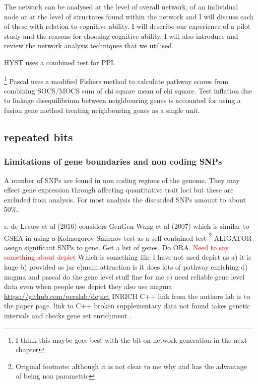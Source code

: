 The network can be analysed at the level of overall network, of an individual node or at the level of structures found within the network and I will discuss each of these with relation to cognitive ability. I will describe our experience of a pilot study and the reasons for choosing cognitive ability. I will also introduce and review the network analysis techniques that we utilised. 

HYST \cite{li2012hyst} uses a combined test for PPI. 

\cite{jia2011dmgwas}

\cite{baranzini2013network}
\footnote{I think this maybe goes best with the bit on network generation in the next chapter}
Pascal uses a modified Fishers method to calculate pathway scores from combining SOCS/MOCS sum of chi square mean of chi square. Test inflation due to linkage disequilibrium between neighbouring genes is accounted for using a fusion gene method treating neighbouring genes as a single unit. %

\subsection{repeated bits}
\subsubsection{Limitations of gene boundaries and non coding SNPs}
A number of SNPs are found in non coding regions of the genome. They may effect gene expression through affecting quantitative trait loci but these are excluded from analysis. For most analysis the discarded SNPs amount to about 50\%.


s. de Leeuw et al (2016) \cite{de2016statistical}
considers GenGen \cite{wang2007pathway} Wang et al (2007) which is similar to GSEA in using a Kolmogorov Smirnov test as a self contained test \footnote{Original footnote: although it is not clear to me why and has the advantage of being non parametric}
ALIGATOR \cite{holmans2009gene} assign significant SNPs to gene. Get a list of genes. Do ORA. 
\textcolor{red}{Need to say something about depict} Which is something like I have not used depict as a) it is huge b) provided as jar c)main attraction is it does lots of pathway enriching d) magma and pascal do the gene level stuff fine for me e) need reliable gene level data even when people use depict they also use magma \url{https://github.com/perslab/depict}
INRICH C++ link from the authors lab is to the paper page. link to C++ broken supplementary data not found takes genetic intervals and checks gene set enrichment \cite{lee2012inrich}.

